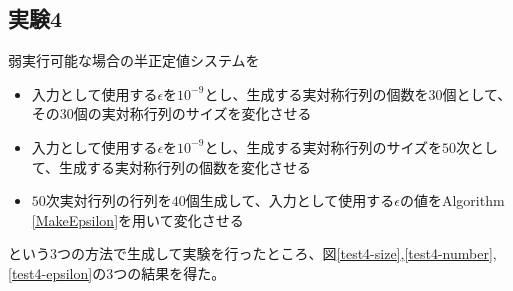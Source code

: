 \subsection{実験4}
弱実行可能な場合\cite{FeasibleAnalysis}の半正定値システムを
\begin{itemize}
  \item 入力として使用する$\epsilon$を$10^{-9}$とし、生成する実対称行列の個数を$30$個として、その$30$個の実対称行列のサイズを変化させる
  \item 入力として使用する$\epsilon$を$10^{-9}$とし、生成する実対称行列のサイズを$50$次として、生成する実対称行列の個数を変化させる
  \item $50$次実対行列の行列を$40$個生成して、入力として使用する$\epsilon$の値をAlgorithm \ref{MakeEpsilon}を用いて変化させる
\end{itemize}
という3つの方法で生成して実験を行ったところ、図\ref{test4-size},\ref{test4-number},\ref{test4-epsilon}の3つの結果を得た。
